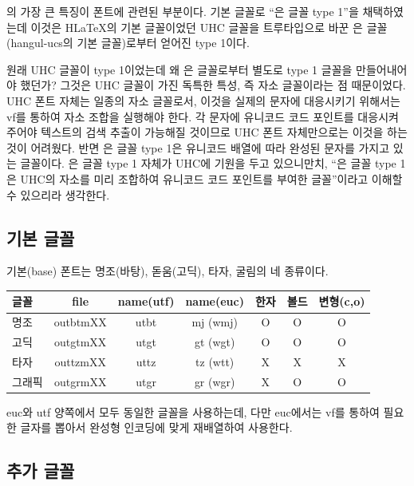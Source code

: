 \kotex 의 가장 큰 특징이 폰트에 관련된 부분이다. 기본 글꼴로
``은 글꼴 type 1''을 채택하였는데 이것은 H\LaTeX 의
기본 글꼴이었던 UHC 글꼴을 트루타입으로
바꾼 은 글꼴(hangul-ucs의 기본 글꼴)로부터 얻어진 type 1이다. 

원래 UHC 글꼴이 type 1이었는데 왜 은 글꼴로부터 별도로 type 1 글꼴을
만들어내어야 했던가? 그것은 UHC 글꼴이 가진 독특한 특성, 즉 자소 글꼴이라는
점 때문이었다. UHC 폰트 자체는 일종의 자소 글꼴로서, 이것을 실제의
문자에 대응시키기 위해서는 vf를 통하여 자소 조합을 실행해야 한다.
각 문자에 유니코드 코드 포인트를 대응시켜주어야 텍스트의 검색 추출이
가능해질 것이므로 UHC 폰트 자체만으로는 이것을 하는 것이 어려웠다.
반면 은 글꼴 type 1은 유니코드 배열에 따라 완성된 문자를 가지고 있는
글꼴이다. 은 글꼴 type 1 자체가 UHC에 기원을 두고 있으니만치, 
``은 글꼴 type 1은 UHC의 자소를 미리 조합하여 유니코드 코드 포인트를
부여한 글꼴''이라고 이해할 수 있으리라 생각한다. 

\begin{center}
\end{center}

\subsection{기본 글꼴}

기본(base) 폰트는 명조(바탕), 돋움(고딕), 타자, 굴림의 네 종류이다. 

\begin{center}
\begin{tabular}{lcccccc}
\hline
글꼴 & file & name(utf) & name(euc) & 한자 & 볼드 & 변형(c,o)\\ \hline
명조 & outbtmXX & utbt & mj (wmj) & O & O & O \\
고딕 & outgtmXX & utgt & gt (wgt) & O & O & O \\
타자 & outtzmXX & uttz & tz (wtt) & X\footnotemark & X & X \\
그래픽 & outgrmXX & utgr & gr (wgr) & X & O & O \\
\hline
\end{tabular}
\end{center}

euc와 utf 양쪽에서 모두 동일한 글꼴을 사용하는데, 다만 euc에서는
vf를 통하여 필요한 글자를 뽑아서 완성형 인코딩에 맞게 재배열하여
사용한다.

\subsection{추가 글꼴} 

